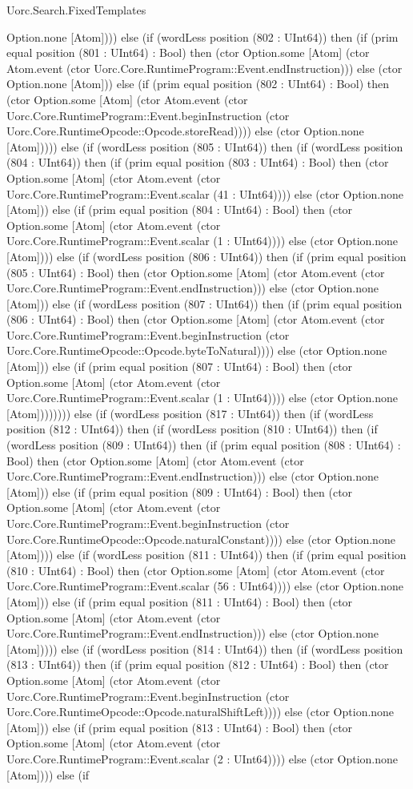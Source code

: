 \begin{lexlean}{Uorc.Search.FixedTemplates}
\begin{semanticmodule}
{Option.none [Atom]))) else (if (wordLess position (802 : UInt64)) then (if (prim equal position (801 : UInt64) : Bool) then (ctor Option.some [Atom] (ctor Atom.event (ctor Uorc.Core.RuntimeProgram::Event.endInstruction))) else (ctor Option.none [Atom])) else (if (prim equal position (802 : UInt64) : Bool) then (ctor Option.some [Atom] (ctor Atom.event (ctor Uorc.Core.RuntimeProgram::Event.beginInstruction (ctor Uorc.Core.RuntimeOpcode::Opcode.storeRead)))) else (ctor Option.none [Atom])))) else (if (wordLess position (805 : UInt64)) then (if (wordLess position (804 : UInt64)) then (if (prim equal position (803 : UInt64) : Bool) then (ctor Option.some [Atom] (ctor Atom.event (ctor Uorc.Core.RuntimeProgram::Event.scalar (41 : UInt64)))) else (ctor Option.none [Atom])) else (if (prim equal position (804 : UInt64) : Bool) then (ctor Option.some [Atom] (ctor Atom.event (ctor Uorc.Core.RuntimeProgram::Event.scalar (1 : UInt64)))) else (ctor Option.none [Atom]))) else (if (wordLess position (806 : UInt64)) then (if (prim equal position (805 : UInt64) : Bool) then (ctor Option.some [Atom] (ctor Atom.event (ctor Uorc.Core.RuntimeProgram::Event.endInstruction))) else (ctor Option.none [Atom])) else (if (wordLess position (807 : UInt64)) then (if (prim equal position (806 : UInt64) : Bool) then (ctor Option.some [Atom] (ctor Atom.event (ctor Uorc.Core.RuntimeProgram::Event.beginInstruction (ctor Uorc.Core.RuntimeOpcode::Opcode.byteToNatural)))) else (ctor Option.none [Atom])) else (if (prim equal position (807 : UInt64) : Bool) then (ctor Option.some [Atom] (ctor Atom.event (ctor Uorc.Core.RuntimeProgram::Event.scalar (1 : UInt64)))) else (ctor Option.none [Atom]))))))) else (if (wordLess position (817 : UInt64)) then (if (wordLess position (812 : UInt64)) then (if (wordLess position (810 : UInt64)) then (if (wordLess position (809 : UInt64)) then (if (prim equal position (808 : UInt64) : Bool) then (ctor Option.some [Atom] (ctor Atom.event (ctor Uorc.Core.RuntimeProgram::Event.endInstruction))) else (ctor Option.none [Atom])) else (if (prim equal position (809 : UInt64) : Bool) then (ctor Option.some [Atom] (ctor Atom.event (ctor Uorc.Core.RuntimeProgram::Event.beginInstruction (ctor Uorc.Core.RuntimeOpcode::Opcode.naturalConstant)))) else (ctor Option.none [Atom]))) else (if (wordLess position (811 : UInt64)) then (if (prim equal position (810 : UInt64) : Bool) then (ctor Option.some [Atom] (ctor Atom.event (ctor Uorc.Core.RuntimeProgram::Event.scalar (56 : UInt64)))) else (ctor Option.none [Atom])) else (if (prim equal position (811 : UInt64) : Bool) then (ctor Option.some [Atom] (ctor Atom.event (ctor Uorc.Core.RuntimeProgram::Event.endInstruction))) else (ctor Option.none [Atom])))) else (if (wordLess position (814 : UInt64)) then (if (wordLess position (813 : UInt64)) then (if (prim equal position (812 : UInt64) : Bool) then (ctor Option.some [Atom] (ctor Atom.event (ctor Uorc.Core.RuntimeProgram::Event.beginInstruction (ctor Uorc.Core.RuntimeOpcode::Opcode.naturalShiftLeft)))) else (ctor Option.none [Atom])) else (if (prim equal position (813 : UInt64) : Bool) then (ctor Option.some [Atom] (ctor Atom.event (ctor Uorc.Core.RuntimeProgram::Event.scalar (2 : UInt64)))) else (ctor Option.none [Atom]))) else (if }
\end{semanticmodule}
\end{lexlean}
